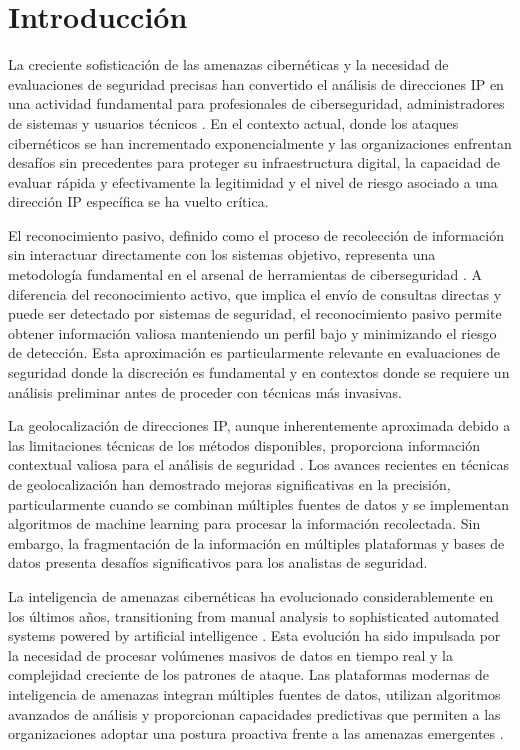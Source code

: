 \section{Introducción}
La creciente sofisticación de las amenazas cibernéticas y la necesidad de evaluaciones de seguridad precisas han convertido el análisis de direcciones IP en una actividad fundamental para profesionales de ciberseguridad, administradores de sistemas y usuarios técnicos \cite{Barni2024}. En el contexto actual, donde los ataques cibernéticos se han incrementado exponencialmente y las organizaciones enfrentan desafíos sin precedentes para proteger su infraestructura digital, la capacidad de evaluar rápida y efectivamente la legitimidad y el nivel de riesgo asociado a una dirección IP específica se ha vuelto crítica.

El reconocimiento pasivo, definido como el proceso de recolección de información sin interactuar directamente con los sistemas objetivo, representa una metodología fundamental en el arsenal de herramientas de ciberseguridad \cite{Alqahtani2020}. A diferencia del reconocimiento activo, que implica el envío de consultas directas y puede ser detectado por sistemas de seguridad, el reconocimiento pasivo permite obtener información valiosa manteniendo un perfil bajo y minimizando el riesgo de detección. Esta aproximación es particularmente relevante en evaluaciones de seguridad donde la discreción es fundamental y en contextos donde se requiere un análisis preliminar antes de proceder con técnicas más invasivas.

La geolocalización de direcciones IP, aunque inherentemente aproximada debido a las limitaciones técnicas de los métodos disponibles, proporciona información contextual valiosa para el análisis de seguridad \cite{Dong2012}. Los avances recientes en técnicas de geolocalización han demostrado mejoras significativas en la precisión, particularmente cuando se combinan múltiples fuentes de datos y se implementan algoritmos de machine learning para procesar la información recolectada. Sin embargo, la fragmentación de la información en múltiples plataformas y bases de datos presenta desafíos significativos para los analistas de seguridad.

La inteligencia de amenazas cibernéticas ha evolucionado considerablemente en los últimos años, transitioning from manual analysis to sophisticated automated systems powered by artificial intelligence \cite{Ferrag2019}. Esta evolución ha sido impulsada por la necesidad de procesar volúmenes masivos de datos en tiempo real y la complejidad creciente de los patrones de ataque. Las plataformas modernas de inteligencia de amenazas integran múltiples fuentes de datos, utilizan algoritmos avanzados de análisis y proporcionan capacidades predictivas que permiten a las organizaciones adoptar una postura proactiva frente a las amenazas emergentes \cite{Lin2023}.

